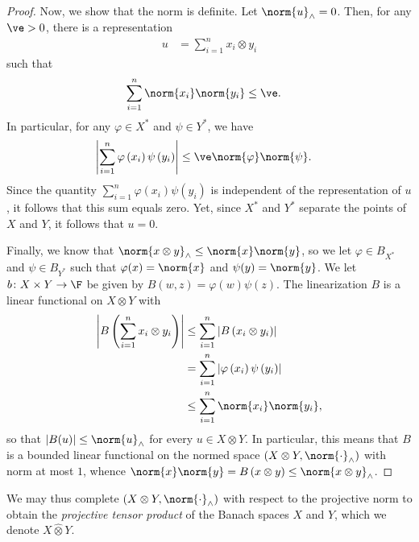 \documentclass[10pt]{mypackage}
\begin{document}
\begin{proof}
  Now, we show that the norm is definite. Let $\norm{u}_{\wedge} = 0$. Then, for any $\ve > 0$, there is a representation
  \begin{align*}
    u &= \sum_{i=1}^{n}x_i\otimes y_i
  \end{align*}
  such that
  \begin{align*}
    \sum_{i=1}^{n}\norm{x_i}\norm{y_i} &\leq \ve.
  \end{align*}
  In particular, for any $\varphi\in X^{\ast}$ and $\psi\in Y^{\ast}$, we have
  \begin{align*}
    \left\vert \sum_{i=1}^{n}\varphi\left( x_i \right)\psi\left( y_i \right) \right\vert &\leq \ve \norm{\varphi}\norm{\psi}.
  \end{align*}
  Since the quantity $\sum_{i=1}^{n}\varphi\left( x_i \right)\psi\left( y_i \right)$ is independent of the representation of $u$, it follows that this sum equals zero. Yet, since $X^{\ast}$ and $Y^{\ast}$ separate the points of $X$ and $Y$, it follows that $u = 0$.

  Finally, we know that $\norm{x\otimes y}_{\wedge}\leq \norm{x}\norm{y}$, so we let $\varphi\in B_{X^{\ast}}$ and $\psi\in B_{Y^{\ast}}$ such that $\varphi(x) = \norm{x}$ and $\psi(y) = \norm{y}$. We let $b\colon X\times Y\rightarrow \F$ be given by $B\left( w,z \right) = \varphi(w)\psi(z)$. The linearization $B$ is a linear functional on $X\otimes Y$ with
  \begin{align*}
    \left\vert B\left( \sum_{i=1}^{n}x_i\otimes y_i \right) \right\vert &\leq \sum_{i=1}^{n} \left\vert B\left( x_i\otimes y_i \right) \right\vert\\
                                                                        &= \sum_{i=1}^{n} \left\vert \varphi\left( x_i \right)\psi\left( y_i \right) \right\vert\\
                                                                        &\leq \sum_{i=1}^{n}\norm{x_i}\norm{y_i},
  \end{align*}
  so that $\left\vert B(u) \right\vert\leq \norm{u}_{\wedge}$ for every $u\in X\otimes Y$. In particular, this means that $B$ is a bounded linear functional on the normed space $\left( X\otimes Y,\norm{\cdot}_{\wedge} \right)$ with norm at most $1$, whence $\norm{x}\norm{y} = B\left( x\otimes y \right) \leq \norm{x\otimes y}_{\wedge}$.
\end{proof}
We may thus complete $\left( X\otimes Y,\norm{\cdot}_{\wedge} \right)$ with respect to the projective norm to obtain the \textit{projective tensor product} of the Banach spaces $X$ and $Y$, which we denote $X\hat{\otimes} Y$.
\end{document}
